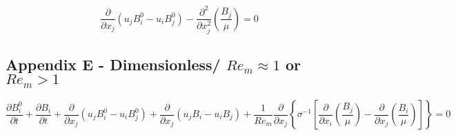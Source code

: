 \documentclass[11pt]{article}
\newcommand{\PD}{\partial}
\newcommand{\SII}{\sigma^{-1}}
\begin{document}
\begin{equation*}
	\frac{\PD}{\PD x_j} (u_j B_i^0 - u_i B_j^0) 
	- 
	\frac{\PD^2}{\PD x_j^2} 
	\left( \frac{B_j}{\mu} \right) 
	= 
	0
\end{equation*}


\subsection{Appendix E - Dimensionless/ \texorpdfstring{$Re_m \approx 1$ or $Re_m>1$}{LG}}

\begin{equation*}
	\frac{\PD B_i^0}{\PD t}
	+
	\frac{\PD B_i}{\PD t} 
	+ 
	\frac{\PD}{\PD x_j} (u_j B_i^0 - u_i B_j^0) 
	+
	\frac{\PD}{\PD x_j} (u_j B_i - u_i B_j) 
	+ 
	\frac{1}{Re_m}
	\frac{\PD}{\PD x_j} 
	\left\{ \SII 
	\left[ 
	\frac{\PD}{\PD x_i} 
	\left( \frac{B_j}{\mu} \right) 
	- 
	\frac{\PD}{\PD x_j} 
	\left( \frac{B_i}{\mu} \right)
	\right]
	\right\}
	= 
	0
\end{equation*}
\end{document}
